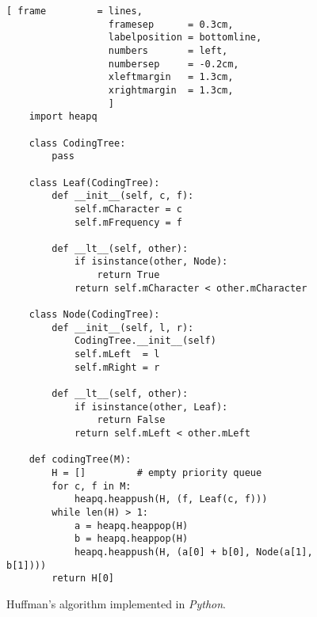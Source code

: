 \begin{figure}[!ht]
\centering
\begin{Verbatim}[ frame         = lines, 
                  framesep      = 0.3cm, 
                  labelposition = bottomline,
                  numbers       = left,
                  numbersep     = -0.2cm,
                  xleftmargin   = 1.3cm,
                  xrightmargin  = 1.3cm,
                  ]
    import heapq
                  
    class CodingTree:
        pass
    
    class Leaf(CodingTree):
        def __init__(self, c, f):
            self.mCharacter = c
            self.mFrequency = f
            
        def __lt__(self, other):
            if isinstance(other, Node):
                return True
            return self.mCharacter < other.mCharacter
                
    class Node(CodingTree):
        def __init__(self, l, r):
            CodingTree.__init__(self)
            self.mLeft  = l
            self.mRight = r
    
        def __lt__(self, other):
            if isinstance(other, Leaf):
                return False
            return self.mLeft < other.mLeft
                
    def codingTree(M):
        H = []         # empty priority queue
        for c, f in M:
            heapq.heappush(H, (f, Leaf(c, f)))
        while len(H) > 1:
            a = heapq.heappop(H)
            b = heapq.heappop(H)
            heapq.heappush(H, (a[0] + b[0], Node(a[1], b[1])))
        return H[0]
\end{Verbatim}
\vspace*{-0.3cm}
\caption{Huffman's algorithm implemented in \textsl{Python}.}
\label{fig:Huffman.ipynb}
\end{figure} 

